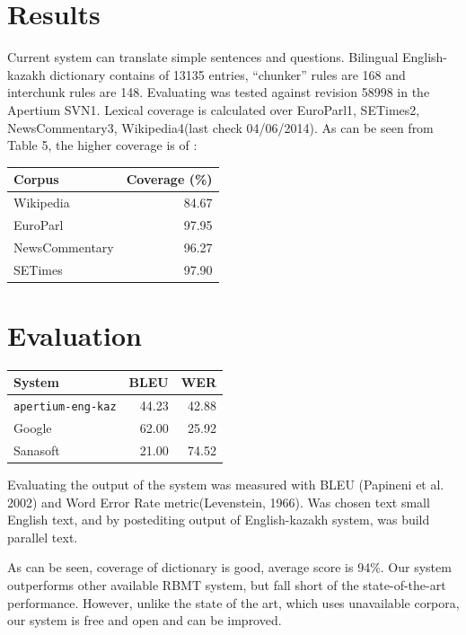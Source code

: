 \documentclass[11pt]{article}
\begin{document}
\section{Results}

Current system can translate simple sentences and questions. Bilingual English-kazakh dictionary contains of  13135 entries, “chunker” rules are 168 and interchunk rules are 148. 
Evaluating was tested against  revision 58998 in the Apertium SVN1. Lexical coverage is calculated over EuroParl1, SETimes2, NewsCommentary3, Wikipedia4(last check 04/06/2014). As can be seen from  Table 5, the higher coverage is of : 

\begin{table}
  \begin{tabular}{|l|r|}
    \hline
    \textbf{Corpus} & \textbf{Coverage} (\%) \\
    \hline
    Wikipedia & 84.67 \\
    EuroParl & 97.95 \\
    NewsCommentary & 96.27 \\
    SETimes & 97.90 \\
    \hline
  \end{tabular}
\end{table}

\section{Evaluation}

\begin{table}
  \begin{tabular}{|l|r|r|}
    \hline
    \textbf{System} & \textbf{BLEU} & \textbf{WER} \\
    \hline
    \texttt{apertium-eng-kaz} & 44.23 & 42.88 \\
    Google & 62.00 & 25.92 \\
    Sanasoft & 21.00 & 74.52 \\
    \hline
  \end{tabular}
\end{table}

Evaluating the output of the system was measured with BLEU (Papineni et al. 2002) and Word Error Rate metric(Levenstein, 1966).  Was chosen text small English text, and by postediting output of English-kazakh system, was build parallel text.

As can be seen,  coverage of dictionary is good, average score is 94\%. Our system outperforms other available RBMT system, but fall short of the state-of-the-art performance. However, unlike the state of the art, which uses unavailable corpora, our system is free and open and can be improved.
\end{document}
